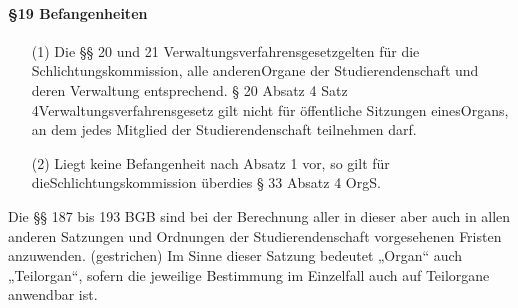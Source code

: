         \paragraph{§19  Befangenheiten}
            \begin{itemize}
                \item[(1)]    Die §§ 20 und 21 Verwaltungsverfahrensgesetzgelten für die Schlichtungskommission, alle anderenOrgane der Studierendenschaft und deren Verwaltung entsprechend. § 20 Absatz 4 Satz 4Verwaltungsverfahrensgesetz gilt nicht für öffentliche Sitzungen einesOrgans, an dem jedes Mitglied der Studierendenschaft teilnehmen darf.
                \item[(2)]    Liegt keine Befangenheit nach Absatz 1 vor, so gilt für dieSchlichtungskommission überdies § 33 Absatz 4 OrgS.
            \end{itemize}
        Die §§ 187 bis 193 BGB sind bei der Berechnung aller in dieser aber auch in allen anderen Satzungen und Ordnungen der Studierendenschaft vorgesehenen Fristen anzuwenden.
            (gestrichen)
        Im Sinne dieser Satzung bedeutet „Organ“ auch „Teilorgan“, sofern die jeweilige Bestimmung im Einzelfall auch auf Teilorgane anwendbar ist.